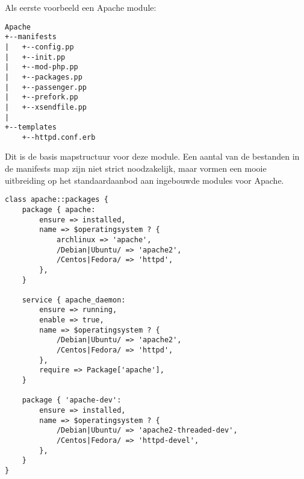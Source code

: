 Als eerste voorbeeld een Apache module:
%
\begin{code}
\begin{lstlisting}
Apache
+--manifests
|	+--config.pp
|	+--init.pp
|	+--mod-php.pp
|	+--packages.pp
|	+--passenger.pp
|	+--prefork.pp
|	+--xsendfile.pp
|
+--templates
	+--httpd.conf.erb
\end{lstlisting}
\end{code}
%
Dit is de basis mapstructuur voor deze module. Een aantal van de bestanden in de manifests map zijn niet strict noodzakelijk, maar vormen een mooie uitbreiding op het standaardaanbod aan ingebouwde modules voor Apache.
\begin{code}
\begin{lstlisting}
class apache::packages {
	package { apache:
		ensure => installed,
		name => $operatingsystem ? {
			archlinux => 'apache',
			/Debian|Ubuntu/ => 'apache2',
			/Centos|Fedora/ => 'httpd',
		},
	}

	service { apache_daemon:
		ensure => running,
		enable => true,
		name => $operatingsystem ? {
			/Debian|Ubuntu/ => 'apache2',
			/Centos|Fedora/ => 'httpd',
		},
		require => Package['apache'],
	}

	package { 'apache-dev':
		ensure => installed,
		name => $operatingsystem ? {
			/Debian|Ubuntu/ => 'apache2-threaded-dev',
			/Centos|Fedora/ => 'httpd-devel',
		},
	}
}
\end{lstlisting}
\end{code}
